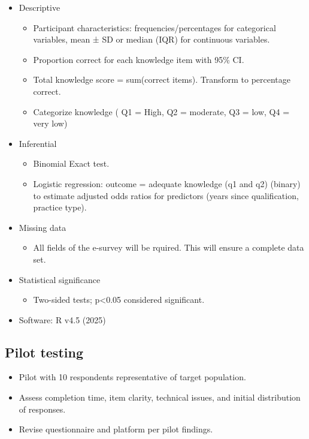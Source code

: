 \documentclass[
  letterpaper,
  DIV=11,
  numbers=noendperiod]{scrartcl}
\providecommand{\tightlist}{%
  \setlength{\itemsep}{0pt}\setlength{\parskip}{0pt}}
\begin{document}
\begin{itemize}
\item
  Descriptive

  \begin{itemize}
  \item
    Participant characteristics: frequencies/percentages for categorical
    variables, mean ± SD or median (IQR) for continuous variables.
  \item
    Proportion correct for each knowledge item with 95\% CI.
  \item
    Total knowledge score = sum(correct items). Transform to percentage
    correct.
  \item
    Categorize knowledge ( Q1 = High, Q2 = moderate, Q3 = low, Q4 = very
    low)
  \end{itemize}
\item
  Inferential

  \begin{itemize}
  \item
    Binomial Exact test.
  \item
    Logistic regression: outcome = adequate knowledge (q1 and q2)
    (binary) to estimate adjusted odds ratios for predictors (years
    since qualification, practice type).
  \end{itemize}
\item
  Missing data

  \begin{itemize}
  \tightlist
  \item
    All fields of the e-survey will be rquired. This will ensure a
    complete data set.
  \end{itemize}
\item
  Statistical significance

  \begin{itemize}
  \tightlist
  \item
    Two-sided tests; p\textless0.05 considered significant.
  \end{itemize}
\item
  Software: R v4.5 (2025)
\end{itemize}

\subsection{Pilot testing}\label{pilot-testing}

\begin{itemize}
\item
  Pilot with 10 respondents representative of target population.
\item
  Assess completion time, item clarity, technical issues, and initial
  distribution of responses.
\item
  Revise questionnaire and platform per pilot findings.
\end{itemize}
\end{document}
